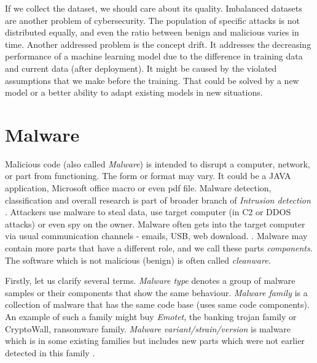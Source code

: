 If we collect the dataset, we should care about its quality. Imbalanced datasets are another problem of cybersecurity. The population of specific attacks is not distributed equally, and even the ratio between benign and malicious varies in time. Another addressed problem is the concept drift. It addresses the decreasing performance of a machine learning model due to the difference in training data and current data (after deployment).  It might be caused by the violated assumptions that we make before the training. That could be solved by a new model or a better ability to adapt existing models in new situations.

\section{Malware}
Malicious code (also called \emph{Malware}) is intended to disrupt a computer, network, or part from functioning. The form or format may vary. It could be a JAVA application, Microsoft office macro or even pdf file. Malware detection, classification and overall research is part of broader branch of \emph{Intrusion detection} \cite{Cole2009}. Attackers use malware to steal data, use target computer (in C2 or DDOS attacks) or even spy on the owner. Malware often gets into the target computer via usual communication channels - emails, USB, web download. \cite{KA2018}. Malware may contain more parts that have a different role, and we call these parts \emph{components}. The software which is not malicious (benign) is often called \emph{cleanware}.

Firstly, let us clarify several terms. \emph{Malware type} denotes a group of malware samples or their components that show the same behaviour. \emph{Malware family} is a collection of malware that has the same code base (uses same code components). An example of such a family might buy \emph{Emotet}, the banking trojan family or CryptoWall, ransomware family. \emph{Malware variant/strain/version} is malware which is in some existing families but includes new parts which were not earlier detected in this family \cite{Cohen2019}.


